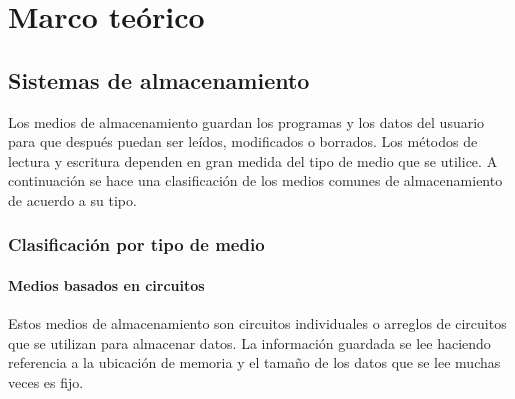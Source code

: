 {
  \linespread{1}
  \cleardoublepage  
  \chapter{Marco te\'{o}rico}
  \label{chap:cap1}
}

  \section {Sistemas de almacenamiento}

Los medios de almacenamiento guardan los programas y los datos del usuario para que despu\'{e}s puedan ser le\'{i}dos, modificados o borrados. Los m\'{e}todos de lectura y escritura dependen en gran medida del tipo de medio que se utilice. A continuaci\'{o}n se hace una clasificaci\'{o}n de los medios comunes de almacenamiento de acuerdo a su tipo.

    \subsection {Clasificaci\'{o}n por tipo de medio}

      \subsubsection*{Medios basados en circuitos}

Estos medios de almacenamiento son circuitos individuales o arreglos de circuitos que se utilizan para almacenar datos. La informaci\'{o}n guardada se lee haciendo referencia a la ubicaci\'{o}n de memoria y el tama\~{n}o de los datos que se lee muchas veces es fijo.

